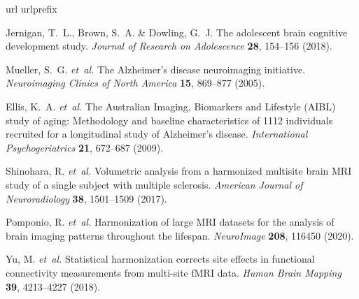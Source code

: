 \documentclass{nature}
\begin{document}
\begin{thebibliography}{10}
	\expandafter\ifx\csname url\endcsname\relax
	\def\url#1{\texttt{#1}}\fi
	\expandafter\ifx\csname urlprefix\endcsname\relax\def\urlprefix{URL }\fi
	\providecommand{\bibinfo}[2]{#2}
	\providecommand{\eprint}[2][]{\url{#2}}
	
	\bibinfo{author}{Jernigan, T.~L.}, \bibinfo{author}{Brown, S.~A.} \&
	\bibinfo{author}{Dowling, G.~J.}
	\newblock \bibinfo{title}{The adolescent brain cognitive development study}.
	\newblock \emph{\bibinfo{journal}{Journal of Research on Adolescence}}
	\textbf{\bibinfo{volume}{28}}, \bibinfo{pages}{154--156}
	(\bibinfo{year}{2018}).
	
	\bibinfo{author}{Mueller, S.~G.} \emph{et~al.}
	\newblock \bibinfo{title}{The {A}lzheimer's disease neuroimaging initiative}.
	\newblock \emph{\bibinfo{journal}{Neuroimaging Clinics of North America}}
	\textbf{\bibinfo{volume}{15}}, \bibinfo{pages}{869--877}
	(\bibinfo{year}{2005}).
	
	\bibinfo{author}{Ellis, K.~A.} \emph{et~al.}
	\newblock \bibinfo{title}{The {A}ustralian {I}maging, {B}iomarkers and
		{L}ifestyle ({AIBL}) study of aging: Methodology and baseline characteristics
		of 1112 individuals recruited for a longitudinal study of {A}lzheimer's
		disease}.
	\newblock \emph{\bibinfo{journal}{International Psychogeriatrics}}
	\textbf{\bibinfo{volume}{21}}, \bibinfo{pages}{672--687}
	(\bibinfo{year}{2009}).
	
	\bibinfo{author}{Shinohara, R.} \emph{et~al.}
	\newblock \bibinfo{title}{Volumetric analysis from a harmonized multisite brain
		{MRI} study of a single subject with multiple sclerosis}.
	\newblock \emph{\bibinfo{journal}{American Journal of Neuroradiology}}
	\textbf{\bibinfo{volume}{38}}, \bibinfo{pages}{1501--1509}
	(\bibinfo{year}{2017}).
	
	\bibinfo{author}{Pomponio, R.} \emph{et~al.}
	\newblock \bibinfo{title}{Harmonization of large {MRI} datasets for the
		analysis of brain imaging patterns throughout the lifespan}.
	\newblock \emph{\bibinfo{journal}{{NeuroImage}}}
	\textbf{\bibinfo{volume}{208}}, \bibinfo{pages}{116450}
	(\bibinfo{year}{2020}).
	
	\bibinfo{author}{Yu, M.} \emph{et~al.}
	\newblock \bibinfo{title}{Statistical harmonization corrects site effects in
		functional connectivity measurements from multi-site {fMRI} data}.
	\newblock \emph{\bibinfo{journal}{Human Brain Mapping}}
	\textbf{\bibinfo{volume}{39}}, \bibinfo{pages}{4213--4227}
	(\bibinfo{year}{2018}).
	

\end{thebibliography}
\end{document}
